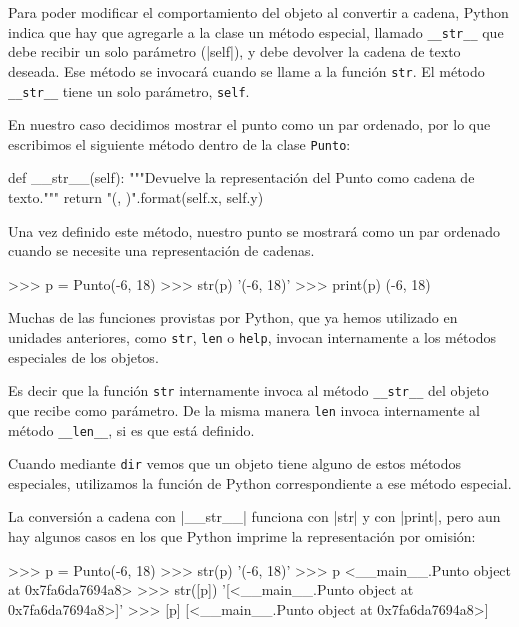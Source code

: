 Para poder modificar el comportamiento del objeto al convertir a cadena, Python
indica que hay que agregarle a la clase un método especial, llamado
\lstinline+__str__+ que debe recibir un solo parámetro (|self|), y
debe devolver la cadena de texto deseada.  Ese método
se invocará cuando se llame a la función \lstinline!str!.
El método \lstinline+__str__+ tiene un solo parámetro, \lstinline!self!.

En nuestro caso decidimos mostrar el punto como un par ordenado, por lo que
escribimos el siguiente método dentro de la clase \lstinline!Punto!:

\begin{codigo-python-sn}
    def __str__(self):
        """Devuelve la representación del Punto como
           cadena de texto."""
        return "({}, {})".format(self.x, self.y)
\end{codigo-python-sn}

Una vez definido este método, nuestro punto se mostrará como un par
ordenado cuando se necesite una representación de cadenas.

\begin{codigo-python-sn}
>>> p = Punto(-6, 18)
>>> str(p)
'(-6, 18)'
>>> print(p)
(-6, 18)
\end{codigo-python-sn}

\begin{sabias_que}
Muchas de las funciones provistas por Python, que ya hemos utilizado en
unidades anteriores, como \lstinline!str!, \lstinline!len! o
\lstinline!help!, invocan internamente a los métodos especiales de los
objetos.

Es decir que la función \lstinline!str!  internamente invoca al método
\lstinline!__str__! del objeto que recibe como parámetro. De la misma
manera \lstinline!len! invoca internamente al método \lstinline!__len__!,
si es que está definido.

Cuando mediante \lstinline!dir! vemos que un objeto tiene alguno de estos
métodos especiales, utilizamos la función de Python correspondiente
a ese método especial.
\end{sabias_que}

La conversión a cadena con |__str__| funciona con |str| y con |print|, pero aun
hay algunos casos en los que Python imprime la representación por omisión:

\begin{codigo-python-sn}
>>> p = Punto(-6, 18)
>>> str(p)
'(-6, 18)'
>>> p
<__main__.Punto object at 0x7fa6da7694a8>
>>> str([p])
'[<__main__.Punto object at 0x7fa6da7694a8>]'
>>> [p]
[<__main__.Punto object at 0x7fa6da7694a8>]
\end{codigo-python-sn}

